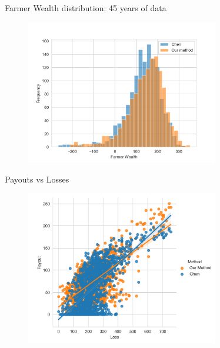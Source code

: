 \documentclass{beamer}
\begin{document}
\begin{frame}{Farmer Wealth distribution: 45 years of data}
    \begin{figure}
        \includegraphics[width=0.75\textwidth]{../../../output/figures/Chen_Replication/farmer_wealth_hist2.png}
    \end{figure}
\end{frame}

\begin{frame}{Payouts vs Losses}
    \begin{figure}
        \includegraphics[width=0.75\textwidth]{../../../output/figures/Chen_Replication/combined_scatter.png}
    \end{figure}
\end{frame}
\end{document}
